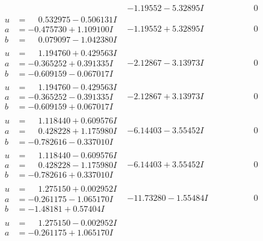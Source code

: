 \documentclass[1p]{elsarticle_modified}
\theoremstyle{definition}
\begin{document}
$$\begin{array}{c|c|c}
 & -1.19552 - 5.32895 I & \phantom{-0.000000 } 0 \\ \hline\begin{aligned}
u &= \phantom{-}0.532975 - 0.506131 I \\
a &= -0.475730 + 1.109100 I \\
b &= \phantom{-}0.079097 - 1.042380 I\end{aligned}
 & -1.19552 + 5.32895 I & \phantom{-0.000000 } 0 \\ \hline\begin{aligned}
u &= \phantom{-}1.194760 + 0.429563 I \\
a &= -0.365252 + 0.391335 I \\
b &= -0.609159 - 0.067017 I\end{aligned}
 & -2.12867 - 3.13973 I & \phantom{-0.000000 } 0 \\ \hline\begin{aligned}
u &= \phantom{-}1.194760 - 0.429563 I \\
a &= -0.365252 - 0.391335 I \\
b &= -0.609159 + 0.067017 I\end{aligned}
 & -2.12867 + 3.13973 I & \phantom{-0.000000 } 0 \\ \hline\begin{aligned}
u &= \phantom{-}1.118440 + 0.609576 I \\
a &= \phantom{-}0.428228 + 1.175980 I \\
b &= -0.782616 - 0.337010 I\end{aligned}
 & -6.14403 - 3.55452 I & \phantom{-0.000000 } 0 \\ \hline\begin{aligned}
u &= \phantom{-}1.118440 - 0.609576 I \\
a &= \phantom{-}0.428228 - 1.175980 I \\
b &= -0.782616 + 0.337010 I\end{aligned}
 & -6.14403 + 3.55452 I & \phantom{-0.000000 } 0 \\ \hline\begin{aligned}
u &= \phantom{-}1.275150 + 0.002952 I \\
a &= -0.261175 - 1.065170 I \\
b &= -1.48181 + 0.57404 I\end{aligned}
 & -11.73280 - 1.55484 I & \phantom{-0.000000 } 0 \\ \hline\begin{aligned}
u &= \phantom{-}1.275150 - 0.002952 I \\
a &= -0.261175 + 1.065170 I \\

\end{aligned}
\end{array}$$
\end{document}

